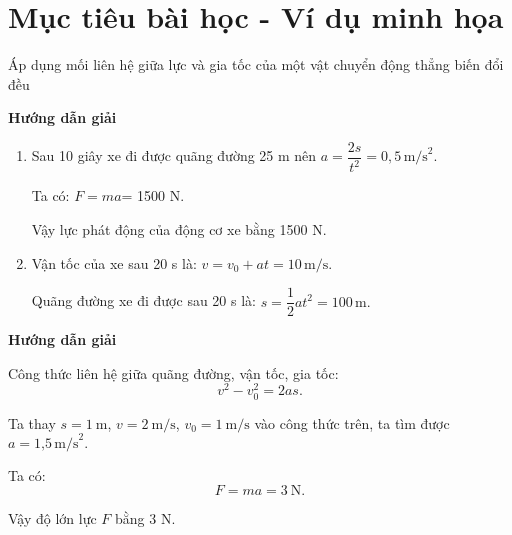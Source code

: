 \section{Mục tiêu bài học - Ví dụ minh họa}
\begin{dang}{Áp dụng mối liên hệ giữa lực và gia tốc của một vật chuyển động thẳng biến đổi đều}
		{	\begin{center}
				\textbf{Hướng dẫn giải}
			\end{center}
			
			\begin{enumerate}[label=\alph*.]
				\item Sau 10 giây xe đi được quãng đường 25 m nên $a=\dfrac{2s}{t^2}= 0,5 \,\text{m/s}^2.$
				
				Ta có: $F=ma$= 1500 N.
				
				Vậy lực phát động của động cơ xe bằng 1500 N.
				\item Vận tốc của xe sau 20 s là:
				$v=v_0+at=10\, \text{m/s}.$
				
				Quãng đường xe đi được sau 20 s là: $s=\dfrac{1}{2}at^2=100\,\text{m}.$  
			\end{enumerate}	
			
		}
		{	\begin{center}
				\textbf{Hướng dẫn giải}
			\end{center}
			Công thức liên hệ giữa quãng đường, vận tốc, gia tốc: $$v^2-v_0^2=2as.$$
			
			Ta thay $s= \SI{1}{\meter}$, $v= \SI{2}{\meter/\second}$, $v_0=\SI{1}{\meter/\second}$ vào công thức trên, ta tìm được $a= \text{1,5} \,\text{m/s}^2.$
			
			Ta có: $$F=ma=\SI{3}{\newton}.$$
			
			Vậy độ lớn lực $F$ bằng 3 N. 
			
		}
	\end{dang}